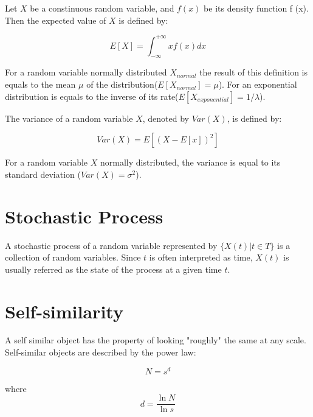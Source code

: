 Let $X$ be a constinuous random variable, and $f(x)$ be its  density function f (x). Then the expected value of $X$ is defined by:

\begin{equation}
E[X] =  \int_{- \infty}^{+ \infty}xf(x) dx 
\end{equation}

For a random variable normally distributed $X_{normal}$ the result of this definition is equals to the mean $\mu$ of the distribution($E[X_{normal}] = \mu$). For an exponential distribution is equals to the inverse of its rate($E[X_{exponential}] = 1/\lambda$).


The variance of a random variable $X$, denoted by $Var(X)$, is defined by:

\begin{equation}
Var(X) =  E[( X - E[x])^{2}] 
\end{equation}


For a random variable $X$ normally distributed, the variance is equal to its standard deviation ($Var(X) = \sigma^{2}$)\cite{ross-probability}. 




\section{Stochastic Process}

A stochastic process of a random variable represented by $\{X(t)| t \in T\}$ is a collection of random variables. Since $t$ is often interpreted as time, $X (t) $ is usually referred as the state of the process at a given time $t$\cite{ross-probability}.


\section{Self-similarity}

A self similar object has the property of looking "roughly" the same at any scale. Self-similar objects are described by the power law:

\begin{equation}
	N = s^{d}
\end{equation}

where 
\begin{equation}
	d = \frac{\ln{N}}{\ln{s}}
\end{equation}

